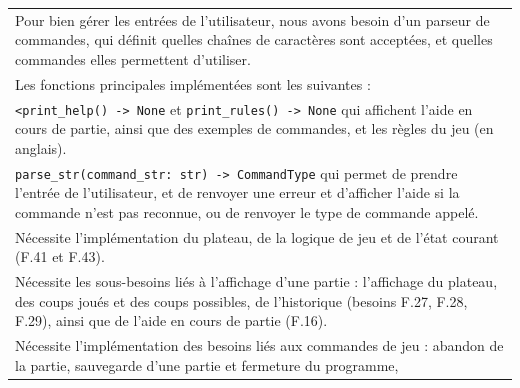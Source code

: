 \documentclass[a4paper,12pt]{article}
\begin{document}
\begin{tabularx}{\textwidth}{|X|}
    Pour bien gérer les entrées de l’utilisateur, nous avons besoin d’un parseur de
    commandes, qui définit quelles chaînes de caractères sont acceptées, et quelles
    commandes elles permettent d’utiliser.                                                                                                                                                                                                      \\ Les fonctions principales
    implémentées sont les suivantes :                                                                                                                                                                                                           \\ \texttt{<print\_help() -> None} et
    \texttt{print\_rules() -> None} qui affichent l’aide en cours de partie, ainsi
    que des exemples de commandes, et les règles du jeu (en anglais).                                                                                                                                                                           \\
    \texttt{parse\_str(command\_str: str) -> CommandType} qui permet de prendre
    l’entrée de l'utilisateur, et de renvoyer une erreur et d’afficher l’aide si la
    commande n’est pas reconnue, ou de renvoyer le type de commande appelé.                                                                                                                                                                     \\
    \hline Nécessite l’implémentation du plateau, de la logique de jeu et de l’état
    courant (F.41 et F.43).                                                                                                                                                                                                                     \\ Nécessite les sous-besoins liés à l’affichage d’une
    partie : l’affichage du plateau, des coups joués et des coups possibles, de
    l’historique (besoins F.27, F.28, F.29), ainsi que de l'aide en cours de partie
    (F.16).                                                                                                                                                                                                                                     \\ Nécessite l'implémentation des besoins liés aux commandes de jeu :
    abandon de la partie, sauvegarde d’une partie et fermeture du programme,

\end{tabularx}
\end{document}

